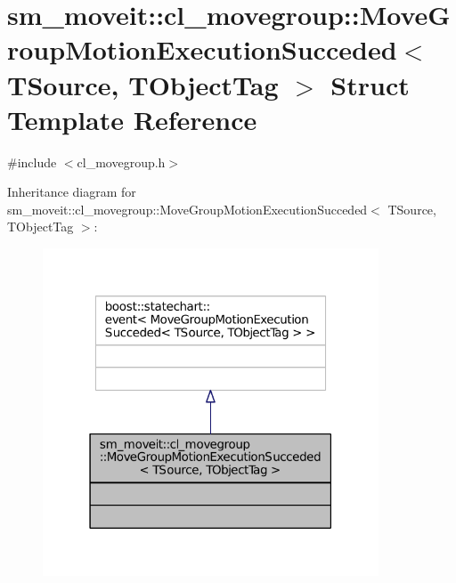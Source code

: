 \hypertarget{structsm__moveit_1_1cl__movegroup_1_1MoveGroupMotionExecutionSucceded}{}\section{sm\+\_\+moveit\+:\+:cl\+\_\+movegroup\+:\+:Move\+Group\+Motion\+Execution\+Succeded$<$ T\+Source, T\+Object\+Tag $>$ Struct Template Reference}
\label{structsm__moveit_1_1cl__movegroup_1_1MoveGroupMotionExecutionSucceded}


{\ttfamily \#include $<$cl\+\_\+movegroup.\+h$>$}



Inheritance diagram for sm\+\_\+moveit\+:\+:cl\+\_\+movegroup\+:\+:Move\+Group\+Motion\+Execution\+Succeded$<$ T\+Source, T\+Object\+Tag $>$\+:
\nopagebreak
\begin{figure}[H]
\begin{center}
\leavevmode
\includegraphics[width=283pt]{structsm__moveit_1_1cl__movegroup_1_1MoveGroupMotionExecutionSucceded__inherit__graph}
\end{center}
\end{figure}


